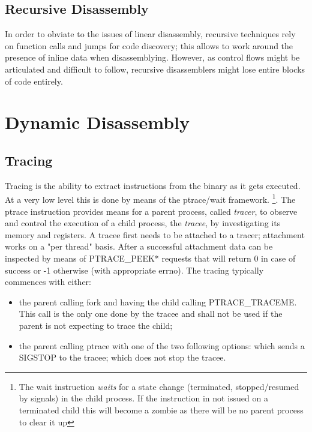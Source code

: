 \subsection{Recursive Disassembly}
In order to obviate to the issues of linear disassembly, recursive techniques rely on function calls and jumps for code
discovery; this allows to work around the presence of inline data when disassemblying. However, as control flows might
be articulated and difficult to follow, recursive disassemblers might lose entire blocks of code entirely.


\section{Dynamic Disassembly}

\subsection{Tracing}
Tracing is the ability to extract instructions from the binary as it gets executed. At a very low level this is done by
means of the {\ttfamily ptrace/wait} framework.
\footnote{The {\ttfamily wait} instruction \textit{waits} for a state change (terminated, stopped/resumed by signals) in
the child process. If the instruction in not issued on a terminated child this will become a zombie as there will be no
parent process to clear it up}.
The {\ttfamily ptrace} instruction provides means for a parent process, called \textit{tracer}, to observe and control
the execution of a child process, the \textit{tracee}, by investigating its memory and registers. A tracee first needs
to be attached to a tracer; attachment works on a "per thread" basis.
After a successful attachment data can be inspected by means of {\ttfamily PTRACE\_PEEK*} requests that will return 0 in
case of success or -1 otherwise (with appropriate {\ttfamily errno}).
The tracing typically commences with either: 
\begin{itemize}
    \item the parent calling {\ttfamily fork} and having the child calling {\ttfamily PTRACE\_TRACEME}. This call is the
        only one done by the tracee and shall not be used if the parent is not expecting to trace the child;
    \item the parent calling {\ttfamily ptrace} with one of the two following options:
         which sends a {\ttfamily SIGSTOP} to the tracee;
         which does not stop the tracee.
\end{itemize}
